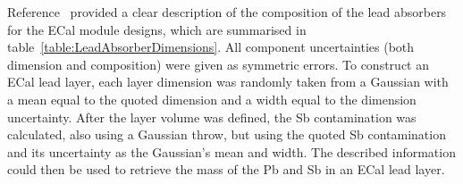 \label{subsubsec:ECalMassLeadAbsorbers}
Reference~\cite{1748-0221-8-10-P10019} provided a clear description of the composition of the lead absorbers for the ECal module designs, which are summarised in table~\ref{table:LeadAbsorberDimensions}.  All component uncertainties (both dimension and composition) were given as symmetric errors.  To construct an ECal lead layer, each layer dimension was randomly taken from a Gaussian with a mean equal to the quoted dimension and a width equal to the dimension uncertainty.  After the layer volume was defined, the Sb contamination was calculated, also using a Gaussian throw, but using the quoted Sb contamination and its uncertainty as the Gaussian's mean and width.  The described information could then be used to retrieve the mass of the Pb and Sb in an ECal lead layer.

